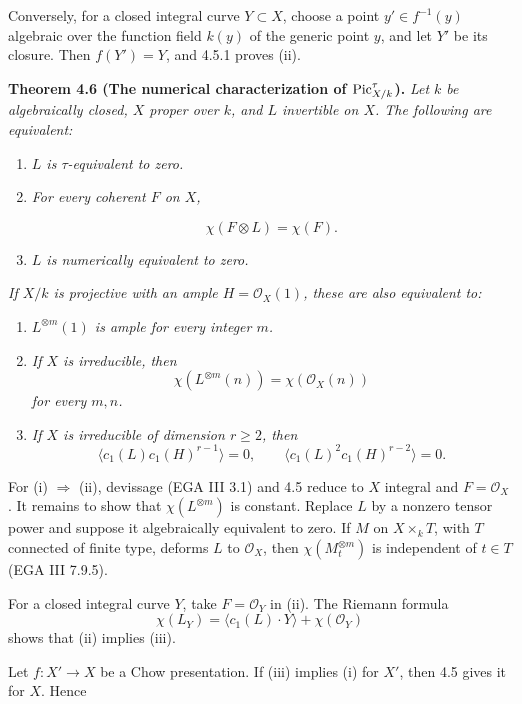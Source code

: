 Conversely, for a closed integral curve \(Y\subset X\), choose a point
\(y'\in f^{-1}(y)\) algebraic over the function field \(k(y)\) of the
generic point \(y\), and let \(Y'\) be its closure. Then \(f(Y')=Y\), and
4.5.1 proves (ii).

\textbf{Theorem 4.6 (The numerical characterization of
\(\operatorname{Pic}^\tau_{X/k}\)).} \emph{Let \(k\) be algebraically closed, \(X\)
proper over \(k\), and \(L\) invertible on \(X\). The following are
equivalent:}
\begin{enumerate}[label=(\roman*)]
\item \emph{\(L\) is \(\tau\)-equivalent to zero.}
\item \emph{For every coherent \(F\) on \(X\),}

\[
\chi(F\otimes L)=\chi(F).
\]
\item \emph{\(L\) is numerically equivalent to zero.}
\end{enumerate}
\emph{If \(X/k\) is projective with an ample
\(H=\mathcal O_X(1)\), these are also equivalent to:}
\begin{enumerate}[label=(\roman*),start=4]
\item \emph{\(L^{\otimes m}(1)\) is ample for every integer \(m\).}
\item \emph{If \(X\) is irreducible, then
\[
\chi(L^{\otimes m}(n))=\chi(\mathcal O_X(n))
\]
for every \(m,n\).}
\item \emph{If \(X\) is irreducible of dimension \(r\ge2\), then
\[
\langle c_1(L)c_1(H)^{r-1}\rangle=0,\qquad
\langle c_1(L)^2c_1(H)^{r-2}\rangle=0.
\]}
\end{enumerate}

For (i) \(\Rightarrow\) (ii), devissage (EGA III 3.1) and 4.5 reduce to
\(X\) integral and \(F=\mathcal O_X\). It remains to show that
\(\chi(L^{\otimes m})\) is constant. Replace \(L\) by a nonzero tensor
power and suppose it algebraically equivalent to zero. If \(M\) on
\(X\times_kT\), with \(T\) connected of finite type, deforms \(L\) to
\(\mathcal O_X\), then \(\chi(M_t^{\otimes m})\) is independent of
\(t\in T\) (EGA III 7.9.5).

For a closed integral curve \(Y\), take \(F=\mathcal O_Y\) in (ii).
The Riemann formula
\[
\chi(L_Y)=\langle c_1(L)\cdot Y\rangle+\chi(\mathcal O_Y)
\]
shows that (ii) implies (iii).

Let \(f:X'\to X\) be a Chow presentation. If (iii) implies (i) for
\(X'\), then 4.5 gives it for \(X\). Hence


